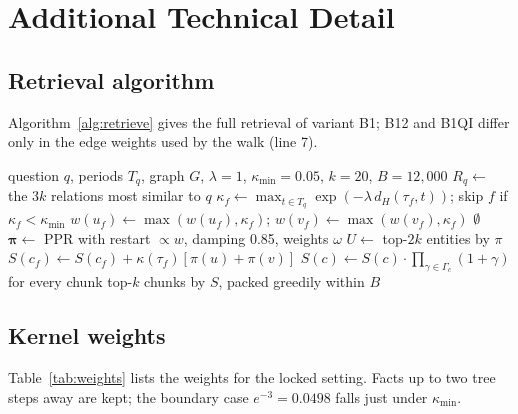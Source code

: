\section{Additional Technical Detail}
\subsection{Retrieval algorithm}
Algorithm~\ref{alg:retrieve} gives the full retrieval of variant B1; B12 and B1QI differ only in the edge weights used by the walk (line 7).

\begin{algorithm}[t]
\caption{Soft-kernel retrieval (variant B1) for one question}
\label{alg:retrieve}
\begin{algorithmic}[1]
\Require question $q$, periods $T_q$, graph $G$, $\lambda{=}1$, $\kappa_{\min}{=}0.05$, $k{=}20$, $B{=}12{,}000$
\State $R_q \gets$ the $3k$ relations most similar to $q$
 
  \State $\kappa_f \gets \max_{t \in T_q} \exp(-\lambda\, d_H(\tau_f, t))$; skip $f$ if $\kappa_f < \kappa_{\min}$
  \State $w(u_f) \gets \max(w(u_f), \kappa_f)$; \; $w(v_f) \gets \max(w(v_f), \kappa_f)$
\EndFor
{} \Return $\emptyset$ \EndIf
\State $\bm{\pi} \gets$ PPR with restart $\propto w$, damping 0.85, weights $\omega$ \Comment{(\ref{eq:ppr})}
\State $U \gets$ top-$2k$ entities by $\pi$
  \State $S(c_f) \gets S(c_f) + \kappa(\tau_f)[\pi(u) + \pi(v)]$ \Comment{(\ref{eq:score})}
\EndFor
\State $S(c) \gets S(c) \cdot \prod_{\gamma \in \Gamma_c}(1 + \gamma)$ for every chunk
\State \Return top-$k$ chunks by $S$, packed greedily within $B$
\end{algorithmic}
\end{algorithm}

\subsection{Kernel weights}
Table~\ref{tab:weights} lists the weights for the locked setting. Facts up to two tree steps away are kept; the boundary case $e^{-3} = 0.0498$ falls just under $\kappa_{\min}$.

